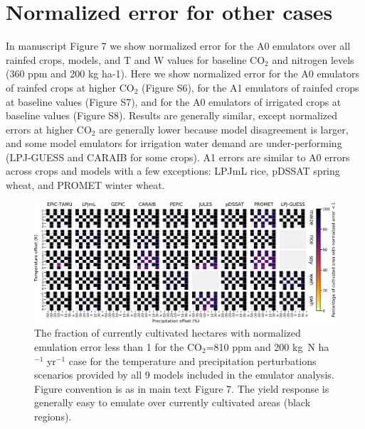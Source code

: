 \documentclass[12pt]{article}
\begin{document}
{{\section{Normalized error for other cases}
\begin{flushleft}
In manuscript Figure 7 we show normalized error for the A0 emulators over all rainfed crops, models, and T and W values for 
baseline CO$_2$ and nitrogen levels (360 ppm and 200 kg ha-1). Here we show normalized error for the A0 emulators of rainfed crops at higher CO$_2$ (Figure S6), for the A1 emulators of rainfed crops at baseline values (Figure S7), and for the A0 emulators of irrigated crops at 
baseline values (Figure S8). 
Results are generally similar, except normalized errors at higher CO$_2$ are generally lower because model disagreement is larger, and some model emulators for irrigation water demand are under-performing (LPJ-GUESS and CARAIB for some crops).
A1 errors are similar to A0 errors across crops and models with a few exceptions: LPJmL rice, pDSSAT spring wheat, and PROMET winter wheat.
\end{flushleft}

\begin{figure}[h!]
  \centering
  \includegraphics[width=15.5cm]{error_grid_810.png}
  \caption{
  The fraction of currently cultivated hectares with normalized emulation error less than 1 for the CO$_2$=810 ppm and 200 kg~N ha$^{-1}$ yr$^{-1}$ case for the temperature and precipitation perturbations scenarios provided by all 9 models included in the emulator analysis. 
  Figure convention is as in main text Figure 7.
  The yield response is generally easy to emulate over currently cultivated areas (black regions).
  }
  \label{fig:error810}
\end{figure}

}}
\end{document}
